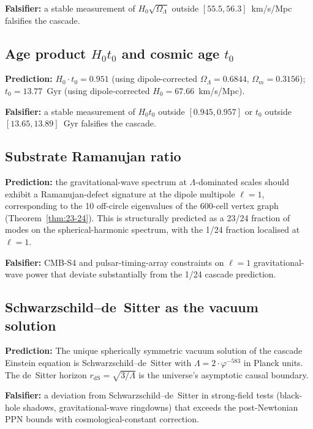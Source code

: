 \documentclass[11pt]{article}
\theoremstyle{plain}
\theoremstyle{definition}
\theoremstyle{remark}
\begin{document}
\textbf{Falsifier:} a stable measurement of $H_0 \sqrt{\Omega_\Lambda}$ outside $[55.5, 56.3]$~km/s/Mpc falsifies the cascade.

\subsection{Age product $H_0 t_0$ and cosmic age $t_0$}

\textbf{Prediction:} $H_0 \cdot t_0 = 0.951$ (using dipole-corrected $\Omega_\Lambda = 0.6844$, $\Omega_m = 0.3156$); $t_0 = 13.77$~Gyr (using dipole-corrected $H_0 = 67.66$~km/s/Mpc).

\textbf{Falsifier:} a stable measurement of $H_0 t_0$ outside $[0.945, 0.957]$ or $t_0$ outside $[13.65, 13.89]$~Gyr falsifies the cascade.

\subsection{Substrate Ramanujan ratio}

\textbf{Prediction:} the gravitational-wave spectrum at $\Lambda$-dominated scales should exhibit a Ramanujan-defect signature at the dipole multipole $\ell = 1$, corresponding to the 10 off-circle eigenvalues of the 600-cell vertex graph (Theorem~\ref{thm:23-24}). This is structurally predicted as a 23/24 fraction of modes on the spherical-harmonic spectrum, with the 1/24 fraction localised at $\ell = 1$.

\textbf{Falsifier:} CMB-S4 and pulsar-timing-array constraints on $\ell = 1$ gravitational-wave power that deviate substantially from the 1/24 cascade prediction.

\subsection{Schwarzschild--de~Sitter as the vacuum solution}

\textbf{Prediction:} The unique spherically symmetric vacuum solution of the cascade Einstein equation is Schwarzschild--de~Sitter with $\Lambda = 2 \cdot \varphi^{-583}$ in Planck units. The de~Sitter horizon $r_\mathrm{dS} = \sqrt{3/\Lambda}$ is the universe's asymptotic causal boundary.

\textbf{Falsifier:} a deviation from Schwarzschild--de~Sitter in strong-field tests (black-hole shadows, gravitational-wave ringdowns) that exceeds the post-Newtonian PPN bounds with cosmological-constant correction.

\end{document}
